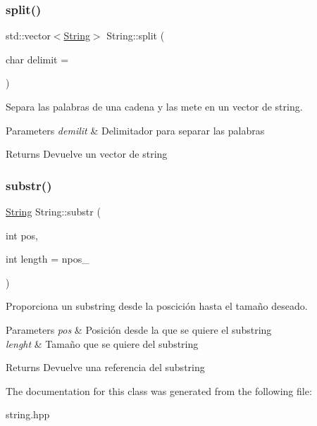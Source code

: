 \subsubsection{\texorpdfstring{split()}{split()}}
{\footnotesize\ttfamily std\+::vector$<$\hyperlink{class_string}{String}$>$ String\+::split (\begin{DoxyParamCaption}\item[{char}]{delimit = {\ttfamily \textquotesingle{}~\textquotesingle{}} }\end{DoxyParamCaption})}



Separa las palabras de una cadena y las mete en un vector de string. 


\begin{DoxyParams}{Parameters}
{\em demilit} & Delimitador para separar las palabras \\
\hline
\end{DoxyParams}
\begin{DoxyReturn}{Returns}
Devuelve un vector de string 
\end{DoxyReturn}
\mbox{\label{class_string_a2f700a145e4069416cc031e9b02d73b7}} 
\subsubsection{\texorpdfstring{substr()}{substr()}}
{\footnotesize\ttfamily \hyperlink{class_string}{String} String\+::substr (\begin{DoxyParamCaption}\item[{int}]{pos,  }\item[{int}]{length = {\ttfamily npos\+\_\+} }\end{DoxyParamCaption})}



Proporciona un substring desde la poscición hasta el tamaño deseado. 


\begin{DoxyParams}{Parameters}
{\em pos} & Posición desde la que se quiere el substring \\
\hline
{\em lenght} & Tamaño que se quiere del substring \\
\hline
\end{DoxyParams}
\begin{DoxyReturn}{Returns}
Devuelve una referencia del substring 
\end{DoxyReturn}


The documentation for this class was generated from the following file\+:\begin{DoxyCompactItemize}
\item 
string.\+hpp\end{DoxyCompactItemize}
